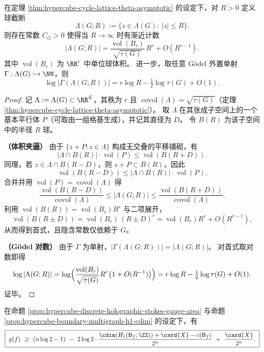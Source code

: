 \begin{corollary}\label{cor:hypercube-cycle-lattice-counting-godel-log}
在定理 \ref{thm:hypercube-cycle-lattice-theta-asymptotic} 的设定下，对 \(R>0\) 定义球截断
\[
\Lambda(G;R):=\{z\in\Lambda(G):\ |z|\le R\}.
\]
则存在常数 \(C_G>0\) 使得当 \(R\to\infty\) 时有渐近计数
\[
\boxed{\;
|\Lambda(G;R)|
=\frac{\operatorname{vol}(B_r)}{\sqrt{\tau(G)}}\,R^r+O(R^{r-1}).
\;}
\]
其中 \(\operatorname{vol}(B_r)\) 为 \(\RR^{r}\) 中单位球体积。
进一步，取任意 Gödel 外置单射 \(\Gamma:\Lambda(G)\hookrightarrow\NN\)，则
\[
\boxed{\;
\log|\Gamma(\Lambda(G;R))|
=r\log R-\tfrac12\log\tau(G)+O(1).
\;}
\]
\end{corollary}
\begin{proof}
记 \(\Lambda:=\Lambda(G)\subset \RR^{E}\)，其秩为 \(r\) 且 \(\operatorname{covol}(\Lambda)=\sqrt{\tau(G)}\)（定理 \ref{thm:hypercube-cycle-lattice-theta-asymptotic}）。
取 \(\Lambda\) 在其张成子空间上的一个基本平行体 \(P\)（可取由一组格基生成），并记其直径为 \(D\)。
令 \(B(R)\) 为该子空间中的半径 \(R\) 球。
\par
\textbf{（体积夹逼）}
由于 \(\{z+P:z\in\Lambda\}\) 构成无交叠的平移铺砌，有
\[
|\Lambda\cap B(R)|\cdot \operatorname{vol}(P)
\le \operatorname{vol}(B(R+D)).
\]
同理，若 \(z\in\Lambda\cap B(R-D)\)，则 \(z+P\subset B(R)\)，因此
\[
\operatorname{vol}(B(R-D))
\le |\Lambda\cap B(R)|\cdot \operatorname{vol}(P).
\]
合并并用 \(\operatorname{vol}(P)=\operatorname{covol}(\Lambda)\) 得
\[
\frac{\operatorname{vol}(B(R-D))}{\operatorname{covol}(\Lambda)}
\le |\Lambda(G;R)|
\le \frac{\operatorname{vol}(B(R+D))}{\operatorname{covol}(\Lambda)}.
\]
利用 \(\operatorname{vol}(B(R))=\operatorname{vol}(B_r)R^r\) 与二项展开，
\[
\operatorname{vol}(B(R\pm D))
=\operatorname{vol}(B_r)\,(R\pm D)^r
=\operatorname{vol}(B_r)R^r+O(R^{r-1}),
\]
从而得到首式，且隐含常数仅依赖于 \(G\)。
\par
\textbf{（Gödel 对数）}
由于 \(\Gamma\) 为单射，\(|\Gamma(\Lambda(G;R))|=|\Lambda(G;R)|\)。
对首式取对数即得
\[
\log|\Lambda(G;R)|
=\log\Bigl(\frac{\operatorname{vol}(B_r)}{\sqrt{\tau(G)}}R^r\bigl(1+O(R^{-1})\bigr)\Bigr)
=r\log R-\tfrac12\log\tau(G)+O(1).
\]
证毕。
\end{proof}





\begin{corollary}[回路圆维与规范体积的互补下界]\label{cor:hypercube-loop-cdim-gauge-volume-complement}
在命题 \ref{prop:hypercube-discrete-holographic-stokes-gauge-area} 与命题 \ref{prop:hypercube-boundary-multigraph-h1-cdim} 的设定下，有
\[
\boxed{\;
g(f)\ \ge\ (n\log 2-1)\ -\ 2\log 2\cdot\frac{\cdim(H_1(\mathsf B_f;\ZZ))+\card{X}-c(\mathsf B_f)}{2^n}\ +\ \frac{\card{X}}{2^n}.
\;}
\]
\end{corollary}

